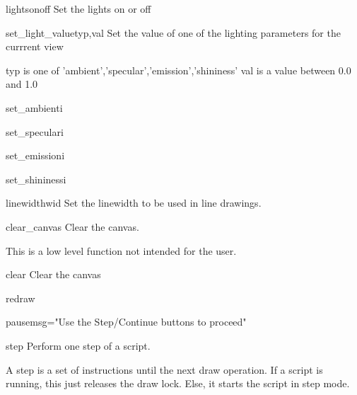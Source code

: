 \begin{funcdesc}{lights}{onoff}
Set the lights on or off
\end{funcdesc}

\begin{funcdesc}{set_light_value}{typ,val}
Set the value of one of the lighting parameters for the currrent view

typ is one of 'ambient','specular','emission','shininess'
val is a value between 0.0 and 1.0

\end{funcdesc}

\begin{funcdesc}{set_ambient}{i}
\end{funcdesc}

\begin{funcdesc}{set_specular}{i}
\end{funcdesc}

\begin{funcdesc}{set_emission}{i}
\end{funcdesc}

\begin{funcdesc}{set_shininess}{i}
\end{funcdesc}

\begin{funcdesc}{linewidth}{wid}
Set the linewidth to be used in line drawings.
\end{funcdesc}

\begin{funcdesc}{clear_canvas}{}
Clear the canvas.

This is a low level function not intended for the user.

\end{funcdesc}

\begin{funcdesc}{clear}{}
Clear the canvas
\end{funcdesc}

\begin{funcdesc}{redraw}{}
\end{funcdesc}

\begin{funcdesc}{pause}{msg="Use the Step/Continue buttons to proceed"}
\end{funcdesc}

\begin{funcdesc}{step}{}
Perform one step of a script.

A step is a set of instructions until the next draw operation.
If a script is running, this just releases the draw lock.
Else, it starts the script in step mode.

\end{funcdesc}

